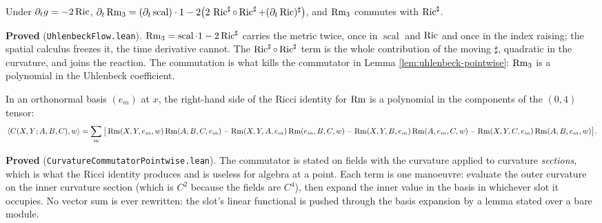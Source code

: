 \begin{lemma}
  \label{lem:curvature-operator-time-derivative}
  \leanok
  Under $\partial_t g = -2\operatorname{Ric}$,
  $\partial_t \operatorname{Rm}_3 = (\partial_t \operatorname{scal})\cdot 1
     - 2\big(2\,\operatorname{Ric}^\sharp\circ\operatorname{Ric}^\sharp + (\partial_t\operatorname{Ric})^\sharp\big)$,
  and $\operatorname{Rm}_3$ commutes with $\operatorname{Ric}^\sharp$.

  \textbf{Proved} (\texttt{UhlenbeckFlow.lean}). $\operatorname{Rm}_3 = \operatorname{scal}\cdot 1 -
  2\operatorname{Ric}^\sharp$ carries the metric twice, once in $\operatorname{scal}$ and $\operatorname{Ric}$ and once in
  the index raising; the spatial calculus freezes it, the time derivative cannot. The
  $\operatorname{Ric}^\sharp\circ\operatorname{Ric}^\sharp$ term is the whole contribution of the moving $\sharp$, quadratic
  in the curvature, and joins the reaction. The commutation is what kills the commutator in
  Lemma \ref{lem:uhlenbeck-pointwise}: $\operatorname{Rm}_3$ is a polynomial in the Uhlenbeck coefficient.
\end{lemma}

\begin{lemma}
  \label{lem:curvature-commutator-pointwise}
  \leanok
  In an orthonormal basis $(e_m)$ at $x$, the right-hand side of the Ricci identity for
  $\operatorname{Rm}$ is a polynomial in the components of the $(0,4)$ tensor:
  \[
    \langle C(X,Y;A,B,C), w\rangle = \sum_m \big[\operatorname{Rm}(X,Y,e_m,w)\operatorname{Rm}(A,B,C,e_m)
      - \operatorname{Rm}(X,Y,A,e_m)\operatorname{Rm}(e_m,B,C,w) - \operatorname{Rm}(X,Y,B,e_m)\operatorname{Rm}(A,e_m,C,w)
      - \operatorname{Rm}(X,Y,C,e_m)\operatorname{Rm}(A,B,e_m,w)\big].
  \]

  \textbf{Proved} (\texttt{CurvatureCommutatorPointwise.lean}). The commutator is stated on
  fields with the curvature applied to curvature \emph{sections}, which is what the Ricci
  identity produces and is useless for algebra at a point. Each term is one manoeuvre: evaluate
  the outer curvature on the inner curvature section (which is $C^2$ because the fields are
  $C^4$), then expand the inner value in the basis in whichever slot it occupies. No vector sum
  is ever rewritten: the slot's linear functional is pushed through the basis expansion by a
  lemma stated over a bare module.
\end{lemma}

